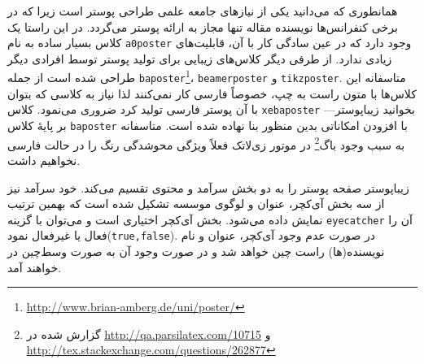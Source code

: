 \documentclass[landscape,debug,paperwidth=1510mm, paperheight=955mm,]{xebaposter}
\begin{document}
\begin{poster}
\begin{posterbox}[name=introduction,column=0,row=0,headershape=smallrounded,
headershade=plain]%
{}
همانطوری که می‌دانید یکی از نیازهای جامعه علمی طراحی پوستر است زیرا که در برخی کنفرانس‌ها نویسنده مقاله تنها مجاز به ارائه پوستر 
می‌گردد. در این راستا یک کلاس بسیار ساده به نام \texttt{a0poster} وجود دارد که در عین سادگی کار با آن، قابلیت‌های زیادی ندارد.
از طرفی دیگر کلاس‌های زیبایی برای تولید پوستر توسط افرادی دیگر طراحی شده است 
از جمله \texttt{baposter}\footnote{\url{http://www.brian-amberg.de/uni/poster/}}،
\texttt{beamerposter} و \texttt{tikzposter}.
متاسفانه این کلاس‌ها با متون راست به چپ، خصوصاً فارسی کار نمی‌کنند لذا نیاز به کلاسی که بتوان با آن پوستر فارسی تولید کرد 
ضروری می‌نمود. کلاس \texttt{xebaposter}%
--بخوانید زیباپوستر--
 بر پایهٔ کلاس \texttt{baposter} با افزودن 
امکاناتی بدین منظور بنا نهاده شده است. 
متاسفانه به سبب وجود باگ‌\footnote{گزارش شده در \url{http://qa.parsilatex.com/10715} 
و \url{http://tex.stackexchange.com/questions/262877}} در موتور زی‌لاتک فعلاً ویژگی محوشدگی رنگ را 
در حالت فارسی نخواهیم داشت.%
\end{posterbox}
\begin{posterbox}[name=posterparts,column=0,span=1,below=introduction,textborder=roundedleft]
{}
زیباپوستر صفحه پوستر را به دو بخش سرآمد  و محتوی تقسیم می‌کند. خود سرآمد نیز از سه بخش آی‌کچر، عنوان و لوگوی موسسه تشکیل 
شده است که بهمین ترتیب نمایش داده می‌شود. بخش آی‌کچر اختیاری است و می‌توان با گزینه \texttt{eyecatcher} آن را فعال یا غیرفعال 
نمود(\texttt{true,false}). در صورت عدم وجود آی‌کچر، عنوان و نام نویسنده‌(ها) راست چین خواهد شد و در صورت وجود آن به صورت 
وسط‌چین در خواهند آمد.


\end{posterbox}
\end{poster}
\end{document}
